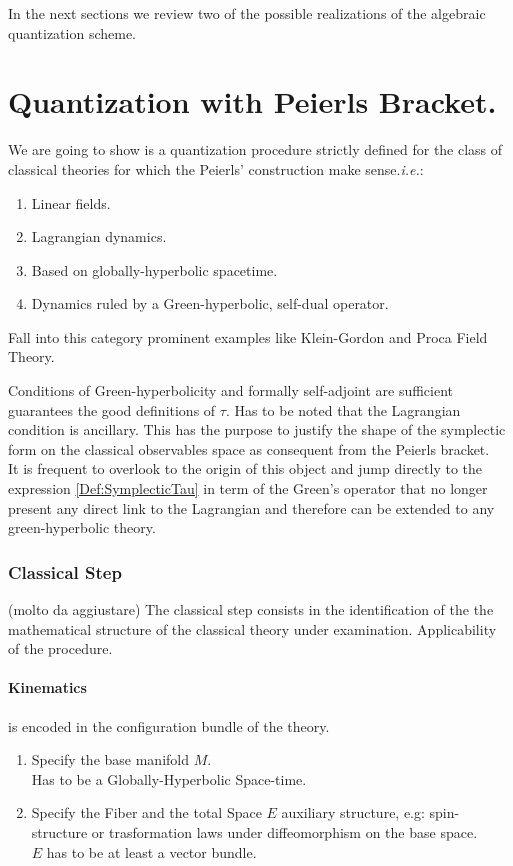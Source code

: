 \documentclass[Main]{subfiles}
\begin{document}
In the next sections we review two of the possible realizations of the algebraic quantization scheme.

\section{Quantization with Peierls Bracket.}
	We are going to show is a quantization procedure strictly defined for the class of classical theories for which the Peierls' construction make sense.\textit{i.e.}:
	\begin{enumerate}
		\item Linear fields.
		\item Lagrangian dynamics.
		\item Based on globally-hyperbolic spacetime.
		\item Dynamics ruled by a Green-hyperbolic, self-dual operator.	
	\end{enumerate}
	Fall into this category prominent examples like Klein-Gordon and Proca Field Theory.\cite{Benini}


	


	\begin{observation}
		Conditions of Green-hyperbolicity and formally self-adjoint are sufficient guarantees the good definitions of $\tau$.
		Has to be noted that the Lagrangian condition is ancillary. This has the purpose to justify the shape of the symplectic form on the classical observables space as consequent from the Peierls bracket.
		\\
	It is frequent\cite{Dewitt1999}\cite{Benini} to overlook to the origin of this object and jump directly to the expression \ref{Def:SymplecticTau}  in term of the Green's operator that no longer present any direct link to the Lagrangian and therefore can be extended to any green-hyperbolic theory.
	\end{observation}

	\subsubsection{Classical Step}%
	\danger (molto da aggiustare)
	The classical step consists in the identification of the the mathematical structure of the classical theory under examination.
	Applicability of the procedure.
	
		\paragraph{Kinematics}
		is encoded in the configuration bundle of the theory.
   					\begin{enumerate}
   						\item Specify the base manifold $M$. \\Has to be a Globally-Hyperbolic Space-time.
   						\item\label{Step:AuxiliaryStructure} Specify the Fiber and the total Space $E$ auxiliary structure, e.g: spin-structure or trasformation laws under diffeomorphism on the base space.\\$E$ has to be at least a vector bundle.
   					\end{enumerate}
   		
\end{document}
